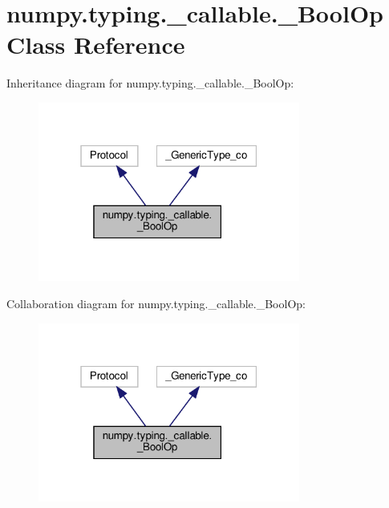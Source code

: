 \hypertarget{classnumpy_1_1typing_1_1__callable_1_1__BoolOp}{}\section{numpy.\+typing.\+\_\+callable.\+\_\+\+Bool\+Op Class Reference}
\label{classnumpy_1_1typing_1_1__callable_1_1__BoolOp}


Inheritance diagram for numpy.\+typing.\+\_\+callable.\+\_\+\+Bool\+Op\+:
\nopagebreak
\begin{figure}[H]
\begin{center}
\leavevmode
\includegraphics[width=244pt]{classnumpy_1_1typing_1_1__callable_1_1__BoolOp__inherit__graph}
\end{center}
\end{figure}


Collaboration diagram for numpy.\+typing.\+\_\+callable.\+\_\+\+Bool\+Op\+:
\nopagebreak
\begin{figure}[H]
\begin{center}
\leavevmode
\includegraphics[width=244pt]{classnumpy_1_1typing_1_1__callable_1_1__BoolOp__coll__graph}
\end{center}
\end{figure}
